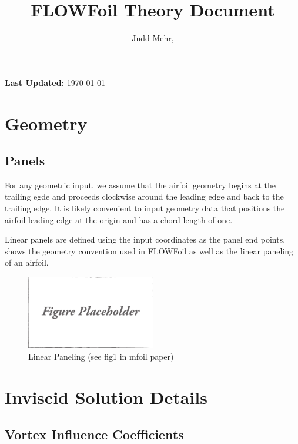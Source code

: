 \documentclass[]{article}
\title{FLOWFoil Theory Document}
\author{Judd Mehr, }
\date{}
\begin{document}
\maketitle

\noindent \textbf{Last Updated:} \mydate\today

\section{Geometry}
\label{sec:geometry}

\subsection{Panels}
\label{ssec:panels}

For any geometric input, we assume that the airfoil geometry begins at the trailing egde and proceeds clockwise around the leading edge and back to the trailing edge.
It is likely convenient to input geometry data that positions the airfoil leading edge at the origin and has a chord length of one.

Linear panels are defined using the input coordinates as the panel end points.
 shows the geometry convention used in FLOWFoil as well as the linear paneling of an airfoil.

\begin{figure}[h]
	\centering
	\includegraphics[width=0.5\textwidth]{draft}
	\caption{Linear Paneling (see fig1 in mfoil paper)}
	\label{fig:linearpanels}
\end{figure}


\section{Inviscid Solution Details}
\label{sec:inviscidsolution}


\subsection{Vortex Influence Coefficients}
\label{ssec:vortexinfluencecoefficients}
\end{document}
